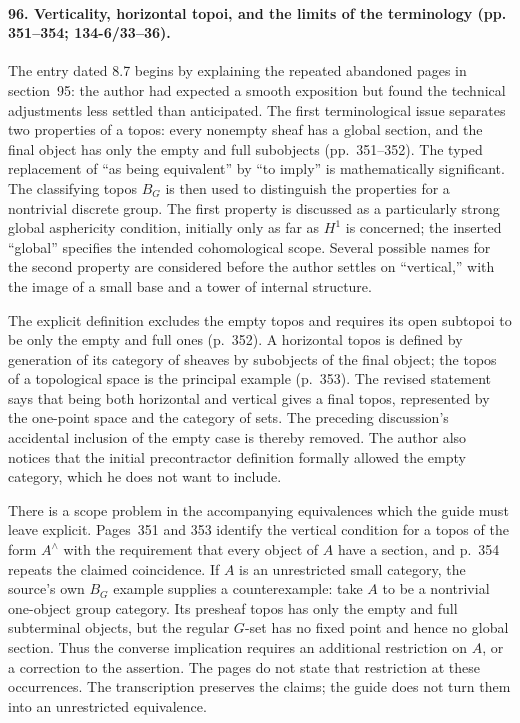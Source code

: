 \paragraph{96. Verticality, horizontal topoi, and the limits of the terminology (pp. 351--354; 134-6/33--36).}
The entry dated 8.7 begins by explaining the repeated abandoned pages in section~95: the author had expected a smooth exposition but found the technical adjustments less settled than anticipated. The first terminological issue separates two properties of a topos: every nonempty sheaf has a global section, and the final object has only the empty and full subobjects (pp.~351--352). The typed replacement of ``as being equivalent'' by ``to imply'' is mathematically significant. The classifying topos $B_G$ is then used to distinguish the properties for a nontrivial discrete group. The first property is discussed as a particularly strong global asphericity condition, initially only as far as $H^1$ is concerned; the inserted ``global'' specifies the intended cohomological scope. Several possible names for the second property are considered before the author settles on ``vertical,'' with the image of a small base and a tower of internal structure.

The explicit definition excludes the empty topos and requires its open subtopoi to be only the empty and full ones (p.~352). A horizontal topos is defined by generation of its category of sheaves by subobjects of the final object; the topos of a topological space is the principal example (p.~353). The revised statement says that being both horizontal and vertical gives a final topos, represented by the one-point space and the category of sets. The preceding discussion's accidental inclusion of the empty case is thereby removed. The author also notices that the initial precontractor definition formally allowed the empty category, which he does not want to include.

There is a scope problem in the accompanying equivalences which the guide must leave explicit. Pages~351 and 353 identify the vertical condition for a topos of the form $A^{\wedge}$ with the requirement that every object of $A$ have a section, and p.~354 repeats the claimed coincidence. If $A$ is an unrestricted small category, the source's own $B_G$ example supplies a counterexample: take $A$ to be a nontrivial one-object group category. Its presheaf topos has only the empty and full subterminal objects, but the regular $G$-set has no fixed point and hence no global section. Thus the converse implication requires an additional restriction on $A$, or a correction to the assertion. The pages do not state that restriction at these occurrences. The transcription preserves the claims; the guide does not turn them into an unrestricted equivalence.

